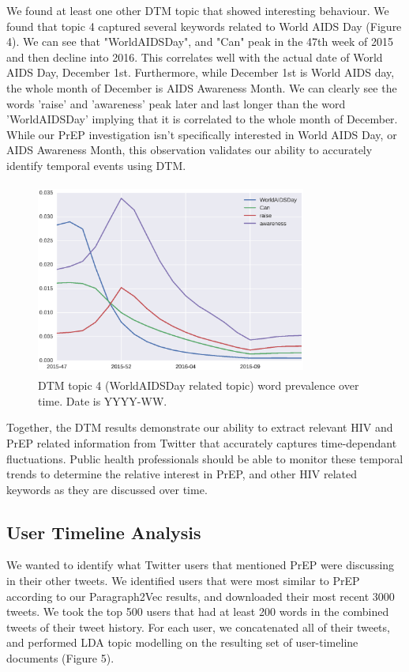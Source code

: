 \documentclass{sig-alternate-05-2015}
\begin{document}
We found at least one other DTM topic that showed interesting behaviour. We found that topic 4 captured several keywords related to World AIDS Day (Figure 4). We can see that "WorldAIDSDay", and "Can" peak in the 47th week of 2015 and then decline into 2016. This correlates well with the actual date of World AIDS Day, December 1st. Furthermore, while December 1st is World AIDS day, the whole month of December is AIDS Awareness Month. We can clearly see the words 'raise' and 'awareness' peak later and last longer than the word 'WorldAIDSDay' implying that it is correlated to the whole month of December. While our PrEP investigation isn't specifically interested in World AIDS Day, or AIDS Awareness Month, this observation validates our ability to accurately identify temporal events using DTM. 

\begin{figure}
\centering
\includegraphics[height=2.5in, width=3.5in]{DTMfig2}
\caption{DTM topic 4 (WorldAIDSDay related topic) word prevalence over time. Date is YYYY-WW.}
\end{figure}

Together, the DTM results demonstrate our ability to extract relevant HIV and PrEP related information from Twitter that accurately captures time-dependant fluctuations. Public health professionals should be able to monitor these temporal trends to determine the relative interest in PrEP, and other HIV related keywords as they are discussed over time.

\subsection{User Timeline Analysis}

We wanted to identify what Twitter users that mentioned PrEP were discussing in their other tweets. We identified users that were most similar to PrEP according to our Paragraph2Vec results, and downloaded their most recent 3000 tweets. We took the top 500 users that had at least 200 words in the combined tweets of their tweet history. For each user, we concatenated all of their tweets, and performed LDA topic modelling on the resulting set of user-timeline documents (Figure 5).
\end{document}
